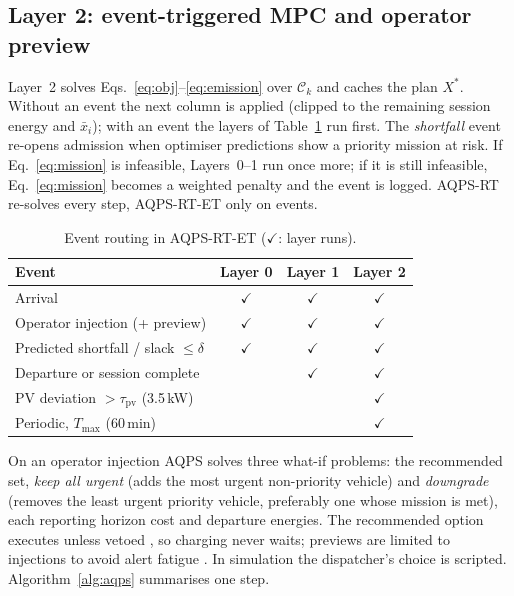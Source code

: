 \documentclass[preprint,12pt]{elsarticle}
\newcommand{\Cset}{\mathcal{C}_k}
\begin{document}
\subsection{Layer 2: event-triggered MPC and operator preview}
\label{sec:et}
Layer~2 solves Eqs.~\eqref{eq:obj}--\eqref{eq:emission} over $\Cset$ and caches the plan $X^\ast$. Without an
event the next column is applied (clipped to the remaining session energy and $\bar{x}_i$); with an event
the layers of Table~\ref{tab:events} run first. The \emph{shortfall} event re-opens admission when optimiser
predictions show a priority mission at risk. If Eq.~\eqref{eq:mission} is infeasible, Layers~0--1 run once
more; if it is still infeasible, Eq.~\eqref{eq:mission} becomes a weighted penalty and the event is logged.
AQPS-RT re-solves every step, AQPS-RT-ET only on events.

\begin{table}[!htbp]
\centering\footnotesize
\caption{Event routing in AQPS-RT-ET ($\checkmark$: layer runs).}
\label{tab:events}
\begin{tabular}{lccc}
\toprule
Event & Layer 0 & Layer 1 & Layer 2 \\
\midrule
Arrival & $\checkmark$ & $\checkmark$ & $\checkmark$ \\
Operator injection (+ preview) & $\checkmark$ & $\checkmark$ & $\checkmark$ \\
Predicted shortfall / slack $\le\delta$ & $\checkmark$ & $\checkmark$ & $\checkmark$ \\
Departure or session complete & & $\checkmark$ & $\checkmark$ \\
PV deviation $>\tau_{\mathrm{pv}}$ (3.5\,kW) & & & $\checkmark$ \\
Periodic, $T_{\max}$ (60\,min) & & & $\checkmark$ \\
\bottomrule
\end{tabular}
\end{table}

On an operator injection AQPS solves three what-if problems: the recommended set, \emph{keep all urgent}
(adds the most urgent non-priority vehicle) and \emph{downgrade} (removes the least urgent priority vehicle,
preferably one whose mission is met), each reporting horizon cost and departure energies. The recommended
option executes unless vetoed \cite{parasuraman2000model}, so charging never waits; previews are limited to
injections to avoid alert fatigue \cite{parasuraman2010complacency}. In simulation the dispatcher's choice is
scripted. Algorithm~\ref{alg:aqps} summarises one step.
\end{document}
